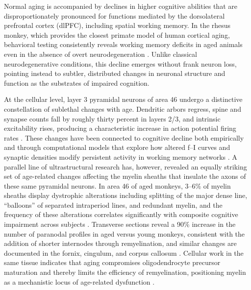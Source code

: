 \documentclass[11pt]{article}
\begin{document}
Normal aging is accompanied by declines in higher cognitive abilities that are disproportionately pronounced for functions mediated by the dorsolateral prefrontal cortex (dlPFC), including spatial working memory. In the rhesus monkey, which provides the closest primate model of human cortical aging, behavioral testing consistently reveals working memory deficits in aged animals even in the absence of overt neurodegeneration \citep{chang2005firing,luebke2010area46}. Unlike classical neurodegenerative conditions, this decline emerges without frank neuron loss, pointing instead to subtler, distributed changes in neuronal structure and function as the substrates of impaired cognition.

At the cellular level, layer 3 pyramidal neurons of area 46 undergo a distinctive constellation of sublethal changes with age. Dendritic arbors regress, spine and synapse counts fall by roughly thirty percent in layers 2/3, and intrinsic excitability rises, producing a characteristic increase in action potential firing rates \citep{peters2008synapses,chang2005firing,coskren2015aging,dickstein2013spines}. These changes have been connected to cognitive decline both empirically and through computational models that explore how altered f--I curves and synaptic densities modify persistent activity in working memory networks \citep{ibanez2020network}. A parallel line of ultrastructural research has, however, revealed an equally striking set of age-related changes affecting the myelin sheaths that insulate the axons of these same pyramidal neurons. In area 46 of aged monkeys, 3--6\% of myelin sheaths display dystrophic alterations including splitting of the major dense line, ``balloons'' of separated intraperiod lines, and redundant myelin, and the frequency of these alterations correlates significantly with composite cognitive impairment across subjects \citep{peters2002aging}. Transverse sections reveal a 90\% increase in the number of paranodal profiles in aged versus young monkeys, consistent with the addition of shorter internodes through remyelination, and similar changes are documented in the fornix, cingulum, and corpus callosum \citep{peters2003remyelination,peters2010fornix,bowley2010cingulate}. Cellular work in the same tissue indicates that aging compromises oligodendrocyte precursor maturation and thereby limits the efficiency of remyelination, positioning myelin as a mechanistic locus of age-related dysfunction \citep{dimovasili2022oligodendrocyte,go2020vesicles}.
\end{document}
